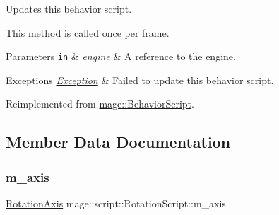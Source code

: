 Updates this behavior script.

This method is called once per frame.


\begin{DoxyParams}[1]{Parameters}
\mbox{\tt in}  & {\em engine} & A reference to the engine. \\
\hline
\end{DoxyParams}

\begin{DoxyExceptions}{Exceptions}
{\em \mbox{\hyperlink{classmage_1_1_exception}{Exception}}} & Failed to update this behavior script. \\
\hline
\end{DoxyExceptions}


Reimplemented from \mbox{\hyperlink{classmage_1_1_behavior_script_a085634661326b59850c1111e537baa4e}{mage\+::\+Behavior\+Script}}.



\subsection{Member Data Documentation}
\mbox{\label{classmage_1_1script_1_1_rotation_script_a334c42c3ca6af6c2713c98ba4151cdbb}} 
\subsubsection{\texorpdfstring{m\+\_\+axis}{m\_axis}}
{\footnotesize\ttfamily \mbox{\hyperlink{classmage_1_1script_1_1_rotation_script_a54e1d1d0af65f43f5bc5ad65a4b9c00a}{Rotation\+Axis}} mage\+::script\+::\+Rotation\+Script\+::m\+\_\+axis\hspace{0.3cm}{\ttfamily [private]}}

